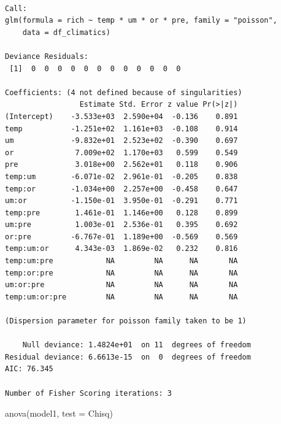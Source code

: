 \documentclass[
  letterpaper,
  DIV=11,
  numbers=noendperiod]{scrartcl}
\newenvironment{Shaded}{\begin{snugshade}}{\end{snugshade}}
\newcommand{\AttributeTok}[1]{\textcolor[rgb]{0.40,0.45,0.13}{#1}}
\newcommand{\FunctionTok}[1]{\textcolor[rgb]{0.28,0.35,0.67}{#1}}
\newcommand{\NormalTok}[1]{\textcolor[rgb]{0.00,0.23,0.31}{#1}}
\newcommand{\StringTok}[1]{\textcolor[rgb]{0.13,0.47,0.30}{#1}}
\begin{document}
\begin{verbatim}

Call:
glm(formula = rich ~ temp * um * or * pre, family = "poisson", 
    data = df_climatics)

Deviance Residuals: 
 [1]  0  0  0  0  0  0  0  0  0  0  0  0

Coefficients: (4 not defined because of singularities)
                 Estimate Std. Error z value Pr(>|z|)
(Intercept)    -3.533e+03  2.590e+04  -0.136    0.891
temp           -1.251e+02  1.161e+03  -0.108    0.914
um             -9.832e+01  2.523e+02  -0.390    0.697
or              7.009e+02  1.170e+03   0.599    0.549
pre             3.018e+00  2.562e+01   0.118    0.906
temp:um        -6.071e-02  2.961e-01  -0.205    0.838
temp:or        -1.034e+00  2.257e+00  -0.458    0.647
um:or          -1.150e-01  3.950e-01  -0.291    0.771
temp:pre        1.461e-01  1.146e+00   0.128    0.899
um:pre          1.003e-01  2.536e-01   0.395    0.692
or:pre         -6.767e-01  1.189e+00  -0.569    0.569
temp:um:or      4.343e-03  1.869e-02   0.232    0.816
temp:um:pre            NA         NA      NA       NA
temp:or:pre            NA         NA      NA       NA
um:or:pre              NA         NA      NA       NA
temp:um:or:pre         NA         NA      NA       NA

(Dispersion parameter for poisson family taken to be 1)

    Null deviance: 1.4824e+01  on 11  degrees of freedom
Residual deviance: 6.6613e-15  on  0  degrees of freedom
AIC: 76.345

Number of Fisher Scoring iterations: 3
\end{verbatim}

\begin{Shaded}
\begin{Highlighting}[]
\FunctionTok{anova}\NormalTok{(model1, }\AttributeTok{test =} \StringTok{\textquotesingle{}Chisq\textquotesingle{}}\NormalTok{)}
\end{Highlighting}
\end{Shaded}
\end{document}
